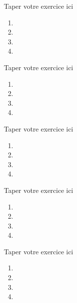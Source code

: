 \documentclass[a4paper, 12pt]{report}
\begin{document}
\begin{myexo}
Taper votre exercice ici
\begin{multicols}{2}
\begin{enumerate}
		\item 
		
		\item 
		\item 
		\item

\end{enumerate}
\end{multicols}
\end{myexo}
\begin{myexo}
	Taper votre exercice ici
		\begin{enumerate}
			\item 
			
			\item 
			\item 
			\item
			
		\end{enumerate}

\end{myexo}
\begin{myexo}
	Taper votre exercice ici
	\begin{enumerate}
		\item 
		
		\item 
		\item 
		\item
		
	\end{enumerate}
	
\end{myexo}
\begin{myexo}
	Taper votre exercice ici
	\begin{enumerate}
		\item 
		
		\item 
		\item 
		\item
		
	\end{enumerate}
	
\end{myexo}
\begin{myexo}
	Taper votre exercice ici
	\begin{enumerate}
		\item 
		
		\item 
		\item 
		\item
		
	\end{enumerate}
	
\end{myexo}
\end{document}

